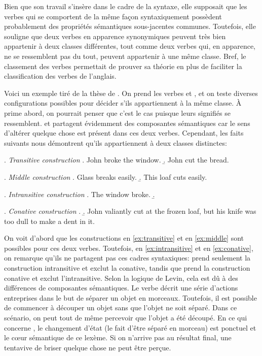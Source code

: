Bien que son travail s'insère dans le cadre de la syntaxe, elle supposait que les verbes qui se comportent de la même façon syntaxiquement possèdent probablement des propriétés sémantiques sous-jacentes communes. Toutefois, elle souligne que deux verbes en apparence synonymiques peuvent très bien appartenir à deux classes différentes, tout comme deux verbes qui, en apparence, ne se ressemblent pas du tout, peuvent appartenir à une même classe. Bref, le classement des verbes permettait de prouver sa théorie en plus de faciliter la classification des verbes de l'anglais.

Voici un exemple tiré de la thèse de \cite[pp.~12--13]{SchulerVerbnetBroadcoverageComprehensive2005}. On prend les verbes  et , et on teste diverses configurations possibles pour décider s'ils appartiennent à la même classe. À prime abord, on pourrait penser que c'est le cas puisque leurs signifiés se ressemblent.  et  partagent évidemment des composantes sémantiques car le sens d'altérer quelque chose est présent dans ces deux verbes. Cependant, les faits suivants nous démontrent qu'ils appartiennent à deux classes distinctes:

\ex. \label{ex:transitive} \emph{Transitive construction}
	\a. John broke the window.
	\b. John cut the bread.
	
\ex. \label{ex:middle} \emph{Middle construction}
	\a. Glass breaks easily.
	\b. This loaf cuts easily.
	
\ex. \label{ex:intransitive} \emph{Intransitive construction}
	\a. The window broke.
	\b. 

\ex. \label{ex:conative} \emph{Conative construction}
	\a.
	\b. John valiantly cut at the frozen loaf, but his knife was too dull to make a dent in it.


On voit d'abord que les constructions en \ref{ex:transitive} et en \ref{ex:middle} sont possibles pour ces deux verbes. Toutefois, en \ref{ex:intransitive} et en \ref{ex:conative}, on remarque qu'ils ne partagent pas ces cadres syntaxiques:  prend seulement la construction intransitive et exclut la conative, tandis que  prend la construction conative et exclut l'intransitive. Selon la logique de Levin, cela est dû à des différences de composantes sémantiques. Le verbe  décrit une série d'actions entreprises dans le but de séparer un objet en morceaux. Toutefois, il est possible de commencer à découper un objet sans que l'objet ne soit séparé. Dans ce scénario, on peut tout de même percevoir que l'objet a été découpé. En ce qui concerne , le changement d'état (le fait d'être séparé en morceau) est ponctuel et le c\oe{}ur sémantique de ce lexème. Si on n'arrive pas au résultat final, une tentavive de briser quelque chose ne peut être perçue.

